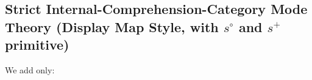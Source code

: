 \documentclass[10pt]{article}
\newcommand\TermTwoT[5]{\ensuremath{#1 \mid #3 \vDash_{#5} #2 : #4}}
\newcommand\TrPlus[2]{\ensuremath{#1^+(#2)}}
\begin{document}



\subsection{Strict Internal-Comprehension-Category Mode Theory (Display Map Style, with $s^\circ$ and $s^+$ primitive)}

We add only:
\end{document}
